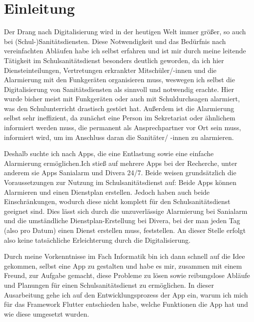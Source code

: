\documentclass[12pt]{article}
\begin{document}
\newpage
\section{Einleitung}
\setcounter{page}{4}
    Der Drang nach Digitalisierung wird in der heutigen Welt immer größer, so auch bei 
    (Schul-)Sanitätsdiensten. 
    Diese Notwendigkeit und das Bedürfnis nach vereinfachten Abläufen habe ich selbst 
    erfahren und ist mir durch meine leitende Tätigkeit im Schulsanitätsdienst besonders 
    deutlich geworden, da ich hier Diensteinteilungen, Vertretungen erkrankter 
    Mitschüler/-innen und die Alarmierung mit den Funkgeräten organisieren muss, weswegen
    ich selbst die Digitalisierung von Sanitätsdiensten als sinnvoll und notwendig erachte.
    Hier wurde bisher meist mit Funkgeräten oder auch mit Schuldurchsagen alarmiert, was
    den Schulunterricht drastisch gestört hat.
    Außerdem ist die Alarmierung selbst sehr ineffizient, da zunächst eine Person 
    im Sekretariat oder ähnlichem informiert werden muss, die permanent als 
    Ansprechpartner vor Ort sein muss, informiert wird, um im Anschluss daran die 
    Sanitäter/ -innen zu alarmieren.

    Deshalb suchte ich nach Apps, die eine Entlastung sowie eine einfache Alarmierung 
    ermöglichen.Ich stieß auf mehrere Apps bei der Recherche, unter anderem sie Apps 
    \glqq Sanialarm\grqq{} und \glqq Divera 24/7\grqq. Beide weisen grundsätzlich die Voraussetzungen zur 
    Nutzung im Schulsanitätsdienst auf: Beide Apps können Alarmieren und einen Dienstplan
    erstellen. Jedoch haben  auch beide Einschränkungen, wodurch diese nicht komplett 
    für den Schulsanitätsdienst geeignet sind. Dies lässt sich durch die unzuverlässige 
    Alarmierung bei Sanialarm und die umständliche Dienstplan-Erstellung bei Divera, bei 
    der man jeden Tag (also pro Datum) einen Dienst erstellen muss, feststellen. 
    An dieser Stelle erfolgt also keine tatsächliche Erleichterung durch die 
    Digitalisierung. 

    Durch meine Vorkenntnisse im Fach Informatik bin ich dann schnell auf die Idee gekommen,
    selbst eine App zu gestalten und habe es mir, zusammen mit einem
    Freund, zur Aufgabe gemacht, diese Probleme zu lösen sowie reibungslose Abläufe und
    Planungen für einen Schulsanitätsdienst zu ermöglichen.
    In dieser Ausarbeitung gehe ich auf den Entwicklungsprozess der App ein, warum ich 
    mich für das Framework\cite{Framework} Flutter entschieden habe, welche Funktionen die App hat und wie
    diese umgesetzt wurden.
    
\end{document}
